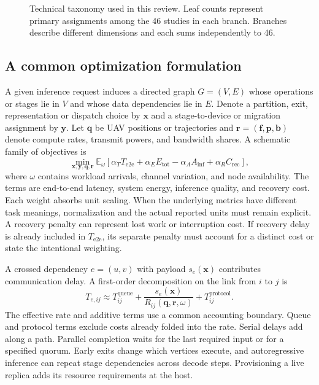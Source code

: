 \documentclass[pdflatex,sn-vancouver-num]{sn-jnl}
\begin{document}
\begin{figure}[htbp]
\centering

\caption{Technical taxonomy used in this review. Leaf counts represent primary assignments among the 46 studies in each branch. Branches describe different dimensions and each sums independently to 46.}\label{fig:taxonomy}
\end{figure}

\subsection{A common optimization formulation}
A given inference request induces a directed graph $G=(V,E)$ whose operations or stages lie in $V$ and whose data dependencies lie in $E$. Denote a partition, exit, representation or dispatch choice by $\mathbf{x}$ and a stage-to-device or migration assignment by $\mathbf{y}$. Let $\mathbf{q}$ be UAV positions or trajectories and $\mathbf{r}=(\mathbf{f},\mathbf{p},\mathbf{b})$ denote compute rates, transmit powers, and bandwidth shares. A schematic family of objectives is
\begin{equation}
\min_{\mathbf{x},\mathbf{y},\mathbf{q},\mathbf{r}}
\mathbb{E}_{\omega}\!\left[
 \alpha_T T_{\mathrm{e2e}} + \alpha_E E_{\mathrm{tot}}
 - \alpha_A A_{\mathrm{inf}} + \alpha_R C_{\mathrm{rec}}
\right],\label{eq:objective}
\end{equation}
where $\omega$ contains workload arrivals, channel variation, and node availability. The terms are end-to-end latency, system energy, inference quality, and recovery cost. Each weight absorbs unit scaling. When the underlying metrics have different task meanings, normalization and the actual reported units must remain explicit. A recovery penalty can represent lost work or interruption cost. If recovery delay is already included in $T_{\mathrm{e2e}}$, its separate penalty must account for a distinct cost or state the intentional weighting.

A crossed dependency $e=(u,v)$ with payload $s_e(\mathbf{x})$ contributes communication delay. A first-order decomposition on the link from $i$ to $j$ is
\begin{equation}
 T_{e,ij}\approx T^{\mathrm{queue}}_{ij}
     +\frac{s_e(\mathbf{x})}{R_{ij}(\mathbf{q},\mathbf{r},\omega)}
     +T^{\mathrm{protocol}}_{ij}.
\label{eq:link}
\end{equation}
The effective rate and additive terms use a common accounting boundary. Queue and protocol terms exclude costs already folded into the rate. Serial delays add along a path. Parallel completion waits for the last required input or for a specified quorum. Early exits change which vertices execute, and autoregressive inference can repeat stage dependencies across decode steps. Provisioning a live replica adds its resource requirements at the host.
\end{document}
